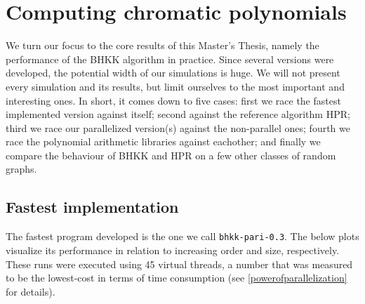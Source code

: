 \documentclass{cslthse-msc}
\newcommand{\code}{\texttt}
\begin{document}
\section{Computing chromatic polynomials}
We turn our focus to the core results of this Master's Thesis, namely the performance of the BHKK algorithm in practice. Since several versions were developed, the potential width of our simulations is huge. We will not present every simulation and its results, but limit ourselves to the most important and interesting ones. In short, it comes down to five cases: first we race the fastest implemented version against itself; second against the reference algorithm HPR; third we race our parallelized version(s) against the non-parallel ones; fourth we race the polynomial arithmetic libraries against eachother; and finally we compare the behaviour of BHKK and HPR on a few other classes of random graphs.

\subsection{Fastest implementation}\label{fastest}
The fastest program developed is the one we call \code{bhkk-pari-0.3}. The below plots visualize its performance in relation to increasing order and size, respectively. These runs were executed using 45 virtual threads, a number that was measured to be the lowest-cost in terms of time consumption (see \ref{powerofparallelization} for details).
\end{document}
